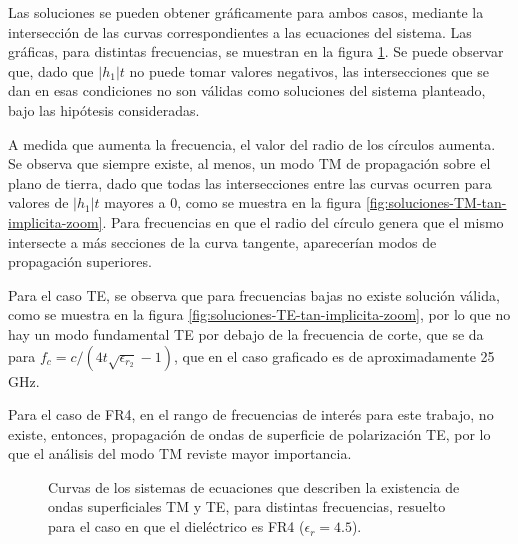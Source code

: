 Las soluciones se pueden obtener gráficamente para ambos casos, mediante la intersección de las curvas correspondientes a las ecuaciones del sistema. Las gráficas, para distintas frecuencias, se muestran en la figura \ref{fig:intersecciones-tm-te}. Se puede observar que, dado que $|h_1|t$ no puede tomar valores negativos, las intersecciones que se dan en esas condiciones no son válidas como soluciones del sistema planteado, bajo las hipótesis consideradas.

A medida que aumenta la frecuencia, el valor del radio de los círculos aumenta. Se observa que siempre existe, al menos, un modo TM de propagación sobre el plano de tierra, dado que todas las intersecciones entre las curvas ocurren para valores de $|h_1| t$ mayores a 0, como se muestra en la figura \ref{fig:soluciones-TM-tan-implicita-zoom}. Para frecuencias en que el radio del círculo genera que el mismo intersecte a más secciones de la curva tangente, aparecerían modos de propagación superiores.

Para el caso TE, se observa que para frecuencias bajas no existe solución válida, como se muestra en la figura \ref{fig:soluciones-TE-tan-implicita-zoom}, por lo que no hay un modo fundamental TE por debajo de la frecuencia de corte, que se da para $f_c = c/(4 t  \sqrt{\epsilon_{r_2}}-1)$, que en el caso graficado es de aproximadamente 25 GHz.

Para el caso de FR4, en el rango de frecuencias de interés para este trabajo, no existe, entonces, propagación de ondas de superficie de polarización TE, por lo que el análisis del modo TM reviste mayor importancia.


\begin{figure} [H]
	\centering 
	\caption{Curvas de los sistemas de ecuaciones que describen la existencia de ondas superficiales TM y TE, para distintas frecuencias, resuelto para el caso en que el dieléctrico es FR4 ($\epsilon_r = 4.5$).}
	\label{fig:intersecciones-tm-te}
\end{figure}

